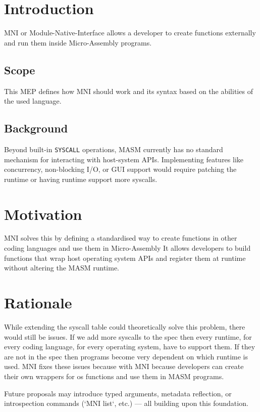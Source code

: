 \documentclass[11pt]{article}
\begin{document}
	\tableofcontents
	\newpage
	
	\section{Introduction}
	MNI or Module-Native-Interface allows a developer to create functions externally and run them inside Micro-Assembly programs.
	
	\subsection{Scope}
	This MEP defines how MNI should work and its syntax based on the abilities of the used language.
	
	\subsection{Background}
	Beyond built-in {\tt SYSCALL} operations, MASM currently has no standard mechanism for interacting with host-system APIs.  
	Implementing features like concurrency, non-blocking I/O, or GUI support would require patching the runtime or having runtime support more syscalls.
	
	\section{Motivation}
	MNI solves this by defining a standardised way to create functions in other coding languages and use them in Micro-Assembly
	It allows developers to build functions that wrap host operating system APIs and register them at runtime without altering the MASM runtime.
	
	\section{Rationale}
	While extending the syscall table could theoretically solve this problem, there would still be issues. If we add more syscalls to the spec then every runtime, for every coding language, for every operating system, have to support them. If they are not in the spec then programs become very dependent on which runtime is used.
	MNI fixes these issues because with MNI because developers can create their own wrappers for os functions and use them in MASM programs.
	
	Future proposals may introduce typed arguments, metadata reflection, or introspection commands (`MNI list`, etc.) — all building upon this foundation.
\end{document}
